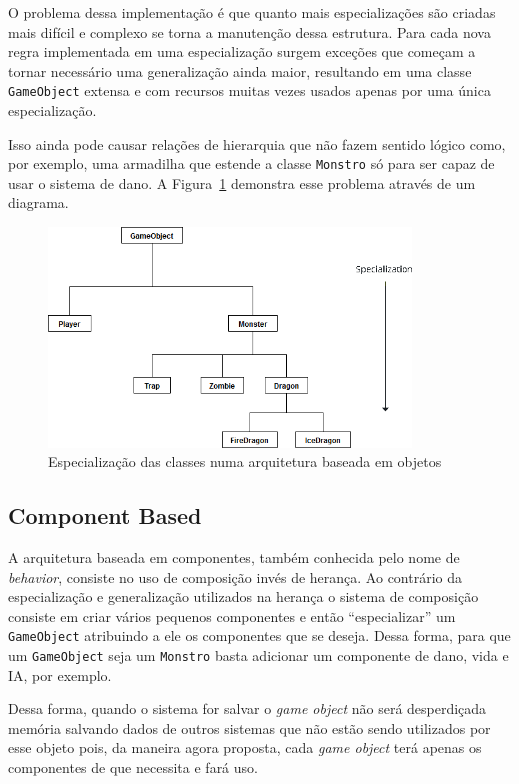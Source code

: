 \documentclass[12pt, 
openright, 
oneside, 
a4paper,    
brazil]{facom-ufu-abntex2}
\begin{document}
O problema dessa implementação é que quanto mais especializações são criadas mais difícil e complexo se torna a manutenção dessa estrutura. Para cada nova regra implementada em uma especialização surgem exceções que começam a tornar necessário uma generalização ainda maior, resultando em uma classe \texttt{GameObject} extensa e com recursos muitas vezes usados apenas por uma única especialização.

Isso ainda pode causar relações de hierarquia que não fazem sentido lógico como, por exemplo, uma armadilha que estende a classe \texttt{Monstro} só para ser capaz de usar o sistema de dano. A Figura~\ref{fig:classSpecializationProblem} demonstra esse problema através de um diagrama.


\begin{figure}[H]
	\centering
	\includegraphics[width=26em]{imagens/gameobject_specialization.png}
	\caption{Especialização das classes numa arquitetura baseada em objetos}
	\label{fig:classSpecializationProblem}
\end{figure}

\subsection{Component Based}
A arquitetura baseada em componentes, também conhecida pelo nome de \textit{behavior}, consiste no uso de composição invés de herança. Ao contrário da especialização e generalização utilizados na herança o sistema de composição consiste em criar vários pequenos componentes e então ``especializar'' um \texttt{GameObject} atribuindo a ele os componentes que se deseja. Dessa forma, para que um \texttt{GameObject} seja um \texttt{Monstro} basta adicionar um componente de dano, vida e IA, por exemplo.

Dessa forma, quando o sistema for salvar o \textit{game object} não será desperdiçada memória salvando dados de outros sistemas que não estão sendo utilizados por esse objeto pois, da maneira agora proposta, cada \textit{game object} terá apenas os componentes de que necessita e fará uso.
\end{document}
